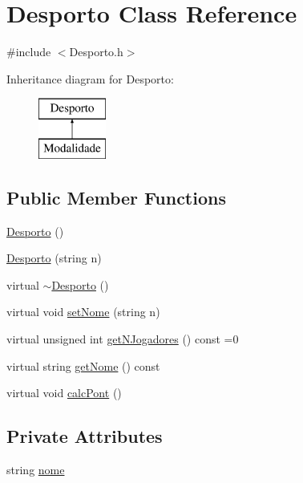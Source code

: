 \hypertarget{class_desporto}{}\section{Desporto Class Reference}
\label{class_desporto}


{\ttfamily \#include $<$Desporto.\+h$>$}

Inheritance diagram for Desporto\+:\begin{figure}[H]
\begin{center}
\leavevmode
\includegraphics[height=2.000000cm]{class_desporto}
\end{center}
\end{figure}
\subsection*{Public Member Functions}
\begin{DoxyCompactItemize}
\item 
\hyperlink{class_desporto_af6abc41a2b8a416e475afb9409226ef6}{Desporto} ()
\item 
\hyperlink{class_desporto_adeb528d743b915077851def7c5ca61c2}{Desporto} (string n)
\item 
virtual \hyperlink{class_desporto_a7b6a35a34e1b599f7531d1af92c35557}{$\sim$\+Desporto} ()
\item 
virtual void \hyperlink{class_desporto_ac5babc7f79c7765c48a1ebe8ea9ba3b4}{set\+Nome} (string n)
\item 
virtual unsigned int \hyperlink{class_desporto_ab03f722e71568b7235c9499876f849c6}{get\+N\+Jogadores} () const  =0
\item 
virtual string \hyperlink{class_desporto_ac55230ea2713d66a7e1c3e8731a4b601}{get\+Nome} () const 
\item 
virtual void \hyperlink{class_desporto_a8f2b72b4e8446f36cbb59caab28e22ff}{calc\+Pont} ()
\end{DoxyCompactItemize}
\subsection*{Private Attributes}
\begin{DoxyCompactItemize}
\item 
string \hyperlink{class_desporto_ad7ccd705ac44cd574cbe1290a698d040}{nome}
\end{DoxyCompactItemize}


